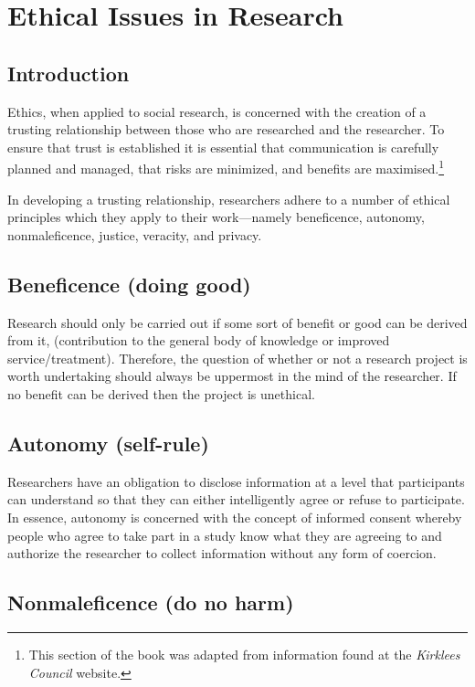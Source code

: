 \section{Ethical Issues in Research}

\subsection{Introduction}

Ethics, when applied to social research, is concerned with the creation of a trusting relationship between those who are researched and the researcher. To ensure that trust is established it is essential that communication is carefully planned and managed, that risks are minimized, and benefits are maximised.\footnote{This section of the book was adapted from information found at the \textit{Kirklees Council} website\cite{kirklees2019ethical}.}

In developing a trusting relationship, researchers adhere to a number of ethical principles which they apply to their work---namely beneficence, autonomy, nonmaleficence, justice, veracity, and privacy.

\subsection{Beneficence (doing good)}

Research should only be carried out if some sort of benefit or good can be derived from it, (\ie contribution to the general body of knowledge or improved service/treatment). Therefore, the question of whether or not a research project is worth undertaking should always be uppermost in the mind of the researcher. If no benefit can be derived then the project is unethical.

\subsection{Autonomy (self-rule)}

Researchers have an obligation to disclose information at a level that participants can understand so that they can either intelligently agree or refuse to participate. In essence, autonomy is concerned with the concept of informed consent whereby people who agree to take part in a study know what they are agreeing to and authorize the researcher to collect information without any form of coercion.

\subsection{Nonmaleficence (do no harm)}

